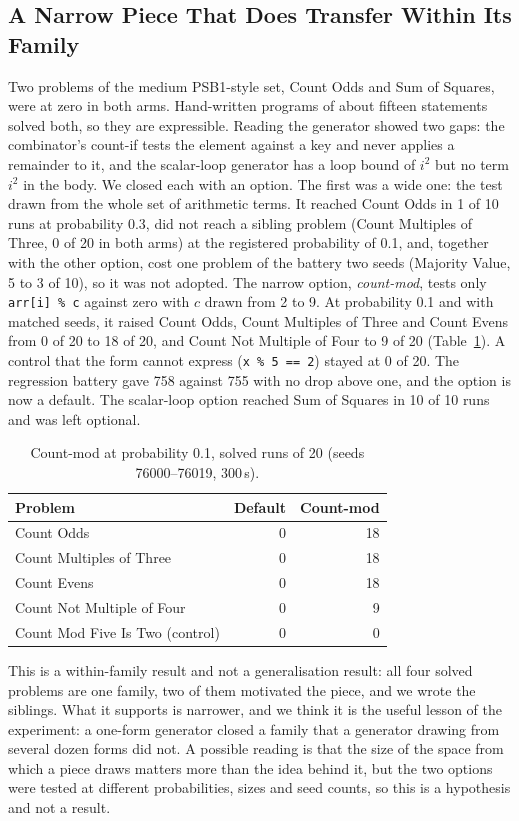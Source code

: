 \documentclass[sigconf,nonacm]{acmart}
\begin{document}
\subsection{A Narrow Piece That Does Transfer Within Its Family}
\label{sec:narrow}
Two problems of the medium PSB1-style set, Count Odds and Sum of Squares, were at zero in both arms. Hand-written programs of about fifteen
statements solved both, so they are expressible. Reading the generator showed two gaps: the combinator's count-if tests the element against a key
and never applies a remainder to it, and the scalar-loop generator has a loop bound of $i^2$ but no term $i^2$ in the body. We closed each with an option.
The first was a wide one: the test drawn from the whole set of arithmetic terms. It reached Count Odds in 1 of 10 runs at probability 0.3, did not reach a sibling problem (Count Multiples of Three, 0 of 20 in both arms) at the registered
probability of 0.1, and, together with the other option, cost one problem of the battery two seeds (Majority Value, 5 to 3 of 10), so it was not adopted.
The narrow option, \emph{count-mod}, tests only \texttt{arr[i] \% c} against zero with $c$ drawn from 2 to 9. At probability 0.1 and with matched seeds,
it raised Count Odds, Count Multiples of Three and Count Evens from 0 of 20 to 18 of 20, and Count Not Multiple of Four to 9 of 20 (Table~\ref{tab:mod}).
A control that the form cannot express (\texttt{x \% 5 == 2}) stayed at 0 of 20. The regression battery gave 758 against 755 with no drop
above one, and the option is now a default. The scalar-loop option reached Sum of Squares in 10 of 10 runs and was left optional.

\begin{table}[t]
  \caption{Count-mod at probability 0.1, solved runs of 20 (seeds 76000--76019, 300\,s).}
  \label{tab:mod}
  \begin{tabular}{lrr}
    \toprule
    Problem & Default & Count-mod \\
    \midrule
    Count Odds & 0 & 18 \\
    Count Multiples of Three & 0 & 18 \\
    Count Evens & 0 & 18 \\
    Count Not Multiple of Four & 0 & 9 \\
    Count Mod Five Is Two (control) & 0 & 0 \\
    \bottomrule
  \end{tabular}
\end{table}

This is a within-family result and not a generalisation result: all four solved problems are one family, two of them motivated the piece, and we
wrote the siblings. What it supports is narrower, and we think it is the useful lesson of the experiment: a one-form generator closed a family that a
generator drawing from several dozen forms did not. A possible reading is that the size of the space from which a piece draws matters more than the idea behind it, but the two options were tested at different probabilities, sizes and seed counts, so this is a hypothesis and not a result.
\end{document}
